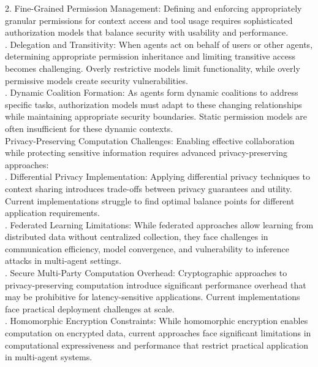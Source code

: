 2. Fine-Grained Permission Management: Defining and enforcing appropriately granular permissions for context access and tool usage requires sophisticated authorization models that balance security with usability and performance.\\ . Delegation and Transitivity: When agents act on behalf of users or other agents, determining appropriate permission inheritance and limiting transitive access becomes challenging. Overly restrictive models limit functionality, while overly permissive models create security vulnerabilities.\\ . Dynamic Coalition Formation: As agents form dynamic coalitions to address specific tasks, authorization models must adapt to these changing relationships while maintaining appropriate security boundaries. Static permission models are often insufficient for these dynamic contexts.\\ \newline
Privacy-Preserving Computation Challenges: Enabling effective collaboration while protecting sensitive information requires advanced privacy-preserving approaches:\\ . Differential Privacy Implementation: Applying differential privacy techniques to context sharing introduces trade-offs between privacy guarantees and utility. Current implementations struggle to find optimal balance points for different application requirements.\\ . Federated Learning Limitations: While federated approaches allow learning from distributed data without centralized collection, they face challenges in communication efficiency, model convergence, and vulnerability to inference attacks in multi-agent settings.\\ . Secure Multi-Party Computation Overhead: Cryptographic approaches to privacy-preserving computation introduce significant performance overhead that may be prohibitive for latency-sensitive applications. Current implementations face practical deployment challenges at scale.\\ . Homomorphic Encryption Constraints: While homomorphic encryption enables computation on encrypted data, current approaches face significant limitations in computational expressiveness and performance that restrict practical application in multi-agent systems.\\ \newline
